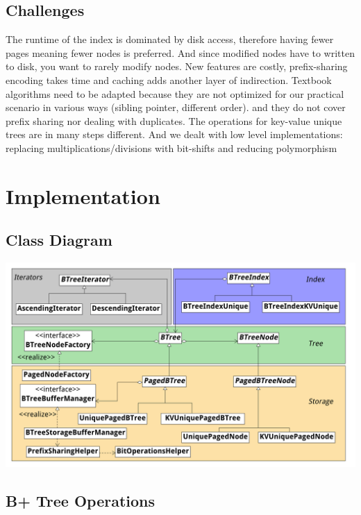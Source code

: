 \documentclass[11pt,a4paper,oneside]{article}
\begin{document}
\subsection{Challenges}

 The runtime of the index is dominated by disk access, therefore having fewer pages meaning fewer nodes is preferred.
 And since modified nodes have to written to disk, you want to rarely modify nodes.
 New features are costly, prefix-sharing encoding takes time and caching adds another layer of indirection.
 Textbook algorithms need to be adapted because they are not optimized for our practical scenario in various ways (sibling pointer, different order).
 and they do not cover prefix sharing nor dealing with duplicates. The operations for key-value unique trees are in many steps different.
 And we dealt with low level implementations: replacing multiplications/divisions with bit-shifts and reducing polymorphism

\section{Implementation}
\subsection{Class Diagram} %
\label{sub:class_diagram}

\includegraphics[scale=0.067]{ZooDBClassDiagram} 


\subsection{B+ Tree Operations} %
\label{sub:b_tree_operations}


\end{document}
